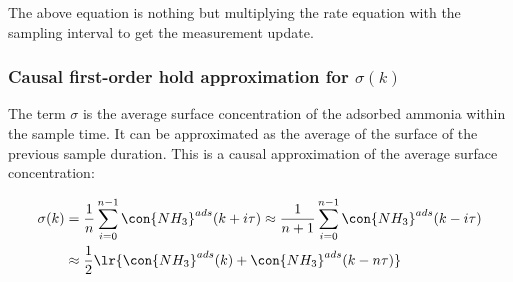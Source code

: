 The above equation is nothing but multiplying the rate equation with the
sampling interval to get the measurement update.


\subsubsection{Causal first-order hold approximation for $\sigma(k)$}

The term $\sigma$ is the average surface concentration of the adsorbed ammonia
within the sample time. It can be approximated as the average of the surface of
the previous sample duration. This is a causal approximation of the average
surface concentration:

\begin{align*}
    \sigma(k) &= \frac{1}{n} \sum_{i=0}^{n-1} \con{NH_3}^{ads} (k + i \tau)
                \approx \frac{1}{n+1} \sum_{i=0}^{n-1} \con{NH_3}^{ads} (k - i \tau)\\
              &\approx \frac{1}{2} \lr{\con{NH_3}^{ads} (k) + \con{NH_3}^{ads} (k - n \tau)}\\
\end{align*}
